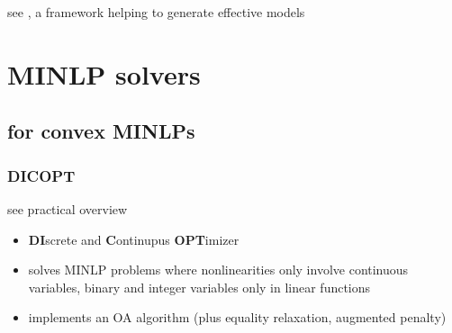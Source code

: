 \documentclass{article}
\begin{document}
\noindent
see \cite{raman1994modelling}, 
a framework helping to generate effective models
\section{MINLP solvers}
\subsection{for convex MINLPs}
\subsubsection{DICOPT}
see practical overview \cite{d2013mixed}
\begin{itemize}
\item \textbf{DI}screte and \textbf{C}ontinupus \textbf{OPT}imizer
\item solves MINLP problems where nonlinearities only involve continuous variables, binary and integer variables only in linear functions
\item implements an OA algorithm (plus equality relaxation, augmented penalty)
\end{itemize}
\end{document}
